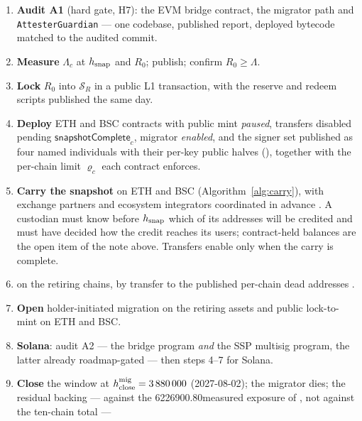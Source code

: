 \begin{enumerate}
\item \textbf{Audit A1} (hard gate, H7): the EVM bridge contract, the migrator
      path and \texttt{Attester\allowbreak{}Guardian} --- one codebase, published report, deployed bytecode
      matched to the audited commit.
\item \textbf{Measure} $\Lambda_c$ at $h_{\mathrm{snap}}$ and $R_0$; publish; confirm
      $R_0 \ge \Lambda$.
\item \textbf{Lock} $R_0$ into $\mathcal{S}_R$ in a public L1 transaction, with the reserve and
      redeem scripts published the same day.
\item \textbf{Deploy} ETH and BSC contracts with public mint \emph{paused}, transfers disabled
      pending $\mathsf{snapshotComplete}_c$, migrator \emph{enabled}, and the signer set published as
      four named individuals with their per-key public halves (), together with the
      per-chain limit $\varrho_c$ each contract enforces.
\item \textbf{Carry the snapshot} on ETH and BSC (Algorithm~\ref{alg:carry}), with exchange partners
      and ecosystem integrators coordinated in advance
      . A custodian must know before $h_{\mathrm{snap}}$
      which of its addresses will be credited and must have decided how the credit reaches its users;
      contract-held balances are the open item of the note above. Transfers enable only when the
      carry is complete.
\item {} on the retiring chains, by transfer to
      the published per-chain dead addresses .
\item \textbf{Open} holder-initiated migration on the retiring assets and public lock-to-mint on ETH
      and BSC.
\item \textbf{Solana}: audit A2 --- the bridge program \emph{and} the SSP multisig program, the
      latter already roadmap-gated --- then steps 4--7 for Solana.
\item \textbf{Close} the window at $h^{\mathrm{mig}}_{\mathrm{close}} = \num{3880000}$ (2027-08-02); the
      migrator dies; the residual backing --- against the \num{6226900.80}\flux measured exposure of
      , not against the ten-chain total --- 
\end{enumerate}


